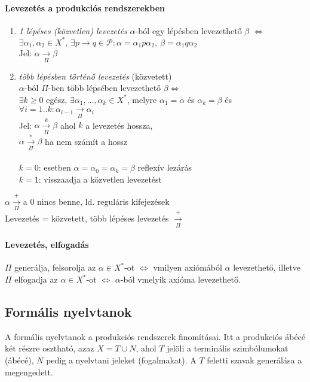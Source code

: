 \documentclass[fleqn,10pt,a4paper]{article}
\newcommand{\listazjbetu}{
  \renewcommand{\theenumi}{\alph{enumi}}
  \renewcommand{\labelenumi}{(\theenumi)}
}
\newenvironment{enumzjbetu}{\listazjbetu\begin{enumerate}}{\end{enumerate}}
\newenvironment{enumzjb}{\begin{enumzjbetu}}{\end{enumzjbetu}}
\theoremstyle{magyar}
\begin{document}
  \paragraph{Levezetés a produkciós rendszerekben}
  \begin{enumzjb}
  \item \emph{1 lépéses (közvetlen) levezetés} $\alpha$-ból egy lépésben levezethető $\beta$ $\iff$\\ $\exists
    \alpha_1,\alpha_2\in X^*,\,\exists p\to q\in \mathcal P: \alpha = \alpha_1 p\alpha_2,\ \beta = \alpha_1 q \alpha_2$\\
    Jel: $\alpha \xrightarrow[\Pi]{} \beta$
  \item \emph{több lépésben történő levezetés} (közvetett)\\
    $\alpha$-ból $\Pi$-ben több lépsében levezethető $\beta \iff$\\
    $\exists k\geq0$ egész, $\exists \alpha_1,\ldots,\alpha_k\in X^*$, melyre $\alpha_1=\alpha$ és $\alpha_k = \beta$ és
    $\forall i=1..k: \alpha_{i-1}\xrightarrow[\Pi]{}\alpha_i$\\
    Jel: $\alpha\xrightarrow[\Pi]{k}\beta$ ahol $k$ a levezetés hossza,\\
    \hspace{1cm}$\alpha \xrightarrow[\Pi]{*} \beta$ ha nem számít a hossz\\\\
    $k=0$: esetben $\alpha=\alpha_0=\alpha_k=\beta$ reflexív lezárás\\
    $k=1$: visszaadja a közvetlen levezetést
  \end{enumzjb}
  $\alpha\xrightarrow[\Pi]{+}$\quad a $0$ nincs benne, ld. reguláris kifejezések\\
  Levezetés = közvetett, több lépéses levezetés
  $\xrightarrow[\Pi]{+}$
  
  \paragraph{Levezetés, elfogadás} $\Pi$ generálja, felsorolja az $\alpha\in X^*$-ot $\iff$ vmilyen axiómából $\alpha$
  levezethető, illetve $\Pi$ elfogadja az $\alpha\in X^*$-ot $\iff$  $\alpha$-ból vmelyik axióma levezethető. 
  
  \subsection{Formális nyelvtanok}
  A formális nyelvtanok a produkciós rendszerek finomításai. Itt a produkciós ábécé két részre osztható, azaz $X  = T
  \cup N$, ahol $T$ jelöli a terminális szimbólumokat (ábécé), $N$ pedig a nyelvtani jeleket (fogalmakat). A $T$ feletti
  szavak generálása a megengedett.
\end{document}
